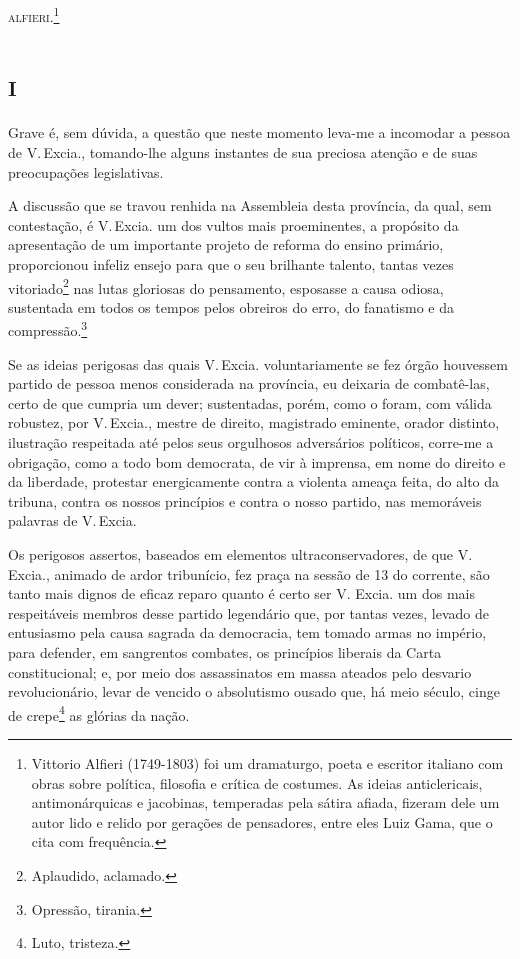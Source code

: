 \textsc{alfieri}.\footnote{Vittorio Alfieri (1749-1803) foi um dramaturgo, poeta
  e escritor italiano com obras sobre política, filosofia e crítica de
  costumes. As ideias anticlericais, antimonárquicas e jacobinas,
  temperadas pela sátira afiada, fizeram dele um autor lido e relido por
  gerações de pensadores, entre eles Luiz Gama, que o cita com
  frequência.\label{alfieri}}

\section{\textsc{i}}

Grave é, sem dúvida, a questão que neste momento leva-me a incomodar a
pessoa de V.\,Excia., tomando-lhe alguns instantes de sua preciosa
atenção e de suas preocupações legislativas.

A discussão que se travou renhida na Assembleia desta província, da
qual, sem contestação, é V.\,Excia. um dos vultos mais proeminentes, a
propósito da apresentação de um importante projeto de reforma do ensino
primário, proporcionou infeliz ensejo para que o seu brilhante talento,
tantas vezes vitoriado\footnote{Aplaudido, aclamado.} nas lutas
gloriosas do pensamento, esposasse a causa odiosa, sustentada em todos
os tempos pelos obreiros do erro, do fanatismo e da
compressão.\footnote{Opressão, tirania.}

Se as ideias perigosas das quais V.\,Excia. voluntariamente se fez órgão
houvessem partido de pessoa menos considerada na província, eu deixaria
de combatê-las, certo de que cumpria um dever; sustentadas, porém, como
o foram, com válida robustez, por V.\,Excia., mestre de direito,
magistrado eminente, orador distinto, ilustração respeitada até pelos
seus orgulhosos adversários políticos, corre-me a obrigação, como a todo
bom democrata, de vir à imprensa, em nome do direito e da liberdade,
protestar energicamente contra a violenta ameaça feita, do alto da
tribuna, contra os nossos princípios e contra o nosso partido, nas
memoráveis palavras de V.\,Excia.

Os perigosos assertos, baseados em elementos ultraconservadores, de que
V.\,Excia., animado de ardor tribunício, fez praça na sessão de 13 do
corrente, são tanto mais dignos de eficaz reparo quanto é certo ser V.
Excia. um dos mais respeitáveis membros desse partido legendário que,
por tantas vezes, levado de entusiasmo pela causa sagrada da democracia,
tem tomado armas no império, para defender, em sangrentos combates, os
princípios liberais da Carta constitucional; e, por meio dos
assassinatos em massa ateados pelo desvario revolucionário, levar de
vencido o absolutismo ousado que, há meio século, cinge de
crepe\footnote{Luto, tristeza.} as glórias da nação.

